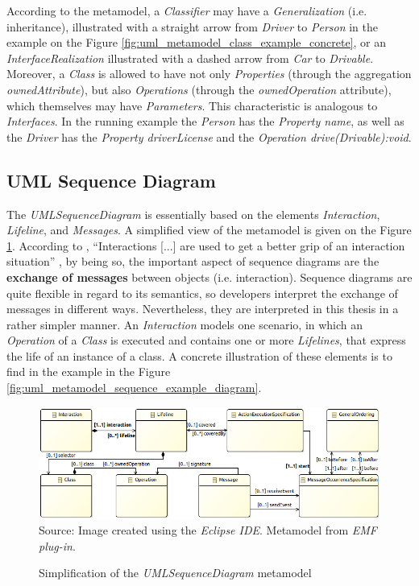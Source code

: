 \documentclass[tuberlin,cic,tc,english,noabntcite,oneside]{iiufrgs}
\begin{document}
According to the metamodel, a \emph{Classifier} may have a \emph{Generalization} (i.e. inheritance), illustrated with a straight arrow from \emph{Driver} to \emph{Person} in the example on the Figure \ref{fig:uml_metamodel_class_example_concrete}, or an \emph{InterfaceRealization}  illustrated with a dashed arrow from \emph{Car} to \emph{Drivable}. Moreover, a \emph{Class} is allowed to have not only \emph{Properties} (through the aggregation \emph{ownedAttribute}), but also \emph{Operations} (through the \emph{ownedOperation} attribute), which themselves may have \emph{Parameters}. This characteristic is analogous to \emph{Interfaces}. In the running example the \emph{Person} has the \emph{Property name}, as well as the \emph{Driver} has the \emph{Property driverLicense} and the \emph{Operation drive(Drivable):void}. 

\subsection{UML Sequence Diagram}
The \emph{UMLSequenceDiagram} is essentially based on the elements \emph{Interaction}, \emph{Lifeline}, and \emph{Messages}. A simplified view of the metamodel is given on the Figure \ref{fig:uml_metamodel_sequence}. According to \citet[p. 563]{omg2007unified}, \enquote{Interactions [...] are used to get a better grip of an interaction situation} \citep[p. 563]{omg2007unified}, by being so, the important aspect of sequence diagrams are the \textbf{exchange of messages} between objects (i.e. interaction). Sequence diagrams are quite flexible in regard to its semantics, so developers interpret the exchange of messages in different ways. Nevertheless, they are interpreted in this thesis in a rather simpler manner. An \emph{Interaction} models one scenario, in which an \emph{Operation} of a \emph{Class} is executed and contains one or more \emph{Lifelines}, that express the life of an instance of a class. A concrete illustration of these elements is to find in the example in the Figure \ref{fig:uml_metamodel_sequence_example_diagram}.

\begin{figure}[H]
	\centering
    \caption{Simplification of the \emph{UMLSequenceDiagram} metamodel}
    \includegraphics[width=\textwidth]{umlSequenceDiagramSimple01} \\
    Source: Image created using the \emph{Eclipse IDE}. Metamodel from \emph{EMF plug-in}.
    \label{fig:uml_metamodel_sequence}
\end{figure}
\end{document}

